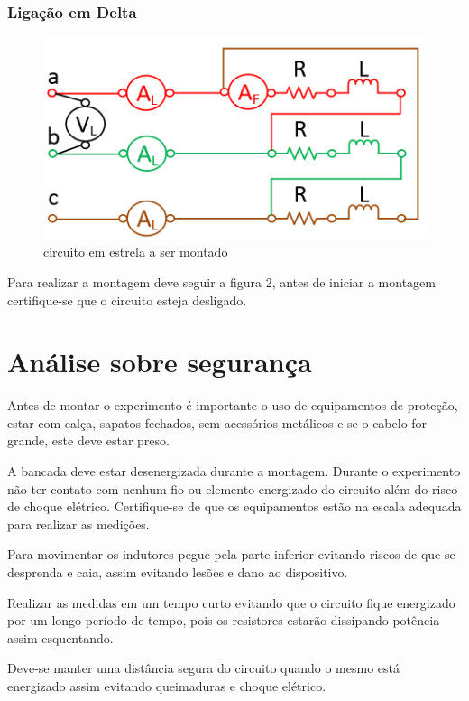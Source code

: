 \documentclass[a4paper, 12pt]{article}
\begin{document}
    \subsubsection{Ligação em Delta}
        \begin{figure}[H]
            \centering %
            \includegraphics[width=0.8\columnwidth]{FOTO2.png} 
            \caption{circuito em estrela a ser montado}
            \label{figura:montada}
        \end{figure}
        
        
         Para realizar a montagem deve seguir a figura 2, antes de iniciar a montagem certifique-se que o circuito esteja desligado.


\newpage
\section{Análise sobre segurança}
    \mbox{}
    \justifying
    Antes de montar o experimento é importante o uso de equipamentos de proteção, estar com calça, sapatos fechados, sem acessórios metálicos e se o cabelo for grande, este deve estar preso.
    
    A bancada deve estar desenergizada durante a montagem. Durante o experimento não ter contato com nenhum fio ou elemento energizado do circuito além do risco de choque elétrico. Certifique-se de que os equipamentos estão na escala adequada para realizar as medições.
    
    Para movimentar os indutores pegue pela parte inferior evitando riscos de que se desprenda e caia, assim evitando lesões e dano ao dispositivo. 
    
    Realizar as medidas em um tempo curto evitando que o circuito fique energizado por um longo período de tempo, pois os resistores estarão dissipando potência assim esquentando.
    
   Deve-se manter uma distância segura do circuito quando o mesmo está energizado assim evitando queimaduras e choque elétrico.
       
\end{document}
